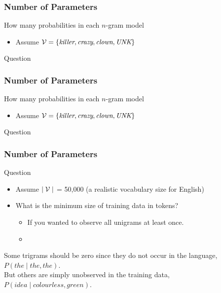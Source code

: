 \begin{frame}
\frametitle{Number of Parameters}
\begin{block}{How many probabilities in each $n$-gram model}
\begin{itemize}
\item Assume ${\cal V} = \{ \textit{killer}, \textit{crazy}, \textit{clown}, \textit{UNK} \}$
\end{itemize}
\end{block}
\pause
\begin{alertblock}{Question}
\end{alertblock}
\end{frame}

\begin{frame}
\frametitle{Number of Parameters}
\begin{block}{How many probabilities in each $n$-gram model}
\begin{itemize}
\item Assume ${\cal V} = \{ \textit{killer}, \textit{crazy}, \textit{clown}, \textit{UNK} \}$
\end{itemize}
\end{block}
\pause
\begin{alertblock}{Question}
\end{alertblock}
\end{frame}

\begin{frame}
\frametitle{Number of Parameters}
\begin{alertblock}{Question}
\begin{itemize}
\item Assume $\mid {\cal V} \mid$ = 50,000 (a realistic vocabulary size for English)
\item What is the minimum size of training data in tokens?
\begin{itemize}
\item If you wanted to observe all unigrams at least once.
\item {}
\end{itemize}
\end{itemize}
\end{alertblock}
\bigskip
\begin{block}{}
Some trigrams should be zero since they do not occur in the language, $P(the \mid the, the)$. \\
But others are simply unobserved in the training data, $P(idea \mid colourless, green)$.
\end{block}
\end{frame}


